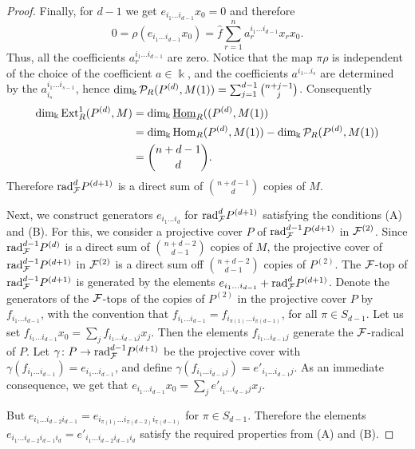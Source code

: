 \documentclass[10pt]{amsart}
\begin{document}
\begin{proof}
\noindent Finally, for $d-1$ we get $e_{i_1\ldots i_{d-1}}x_0 =0$ and therefore $$0=\rho (e_{i_1\ldots i_{d-1}}x_0)=\hat f\sum_{r=1}^na^{i_1\ldots i_{d-1}}_rx_r x_0.$$ 
\noindent Thus, all the coefficients
$a^{i_1\ldots i_{d-1}}_r$ are zero. Notice that the map $\pi\rho$ is independent  of the choice of 
the coefficient $a\in\Bbbk$, and the coefficients  $a^{i_1\ldots i_s}$ are determined by the $a^{i_1\ldots i_{s-1}}_{i_s}$,
hence $\operatorname{dim}\nolimits_{\Bbbk}\mathcal P_R(P^{(d)},M(1))=\sum_{j=1}^{d-1}\binom{n+j-1}{j}$. Consequently
\begin{align*}
\operatorname{dim}\nolimits_{\Bbbk}\operatorname{Ext}\nolimits_R^1(P^{(d)},M)\notag&=\operatorname{dim}\nolimits_{\Bbbk}\underline{\operatorname{Hom}}_R((P^{(d)},M(1))\notag\\&
=\operatorname{dim}\nolimits_{\Bbbk}\operatorname{Hom}_R(P^{(d)},M(1))-\operatorname{dim}\nolimits_{\Bbbk}\mathcal P_R(P^{(d)},M(1))\notag\\&=\binom{n+d-1}{d}.
\end{align*}
Therefore $\mbox{rad}_{\mathcal F}^{d}P^{(d+1)}$  is a direct sum
of $\binom{n+d-1}{d}$ copies of $M$.
\medskip

\noindent  Next, we construct generators $e_{i_1\ldots i_d}$ for $\mbox{rad}_{\mathcal F}^{d}P^{(d+1)}$ 
satisfying the conditions (A) and (B). For this, we consider a projective cover $P$ of $\mbox{rad}_{\mathcal F}^{d-1}P^{(d+1)}$ 
in $\mathcal F^{(2)}$.
 Since  $\mbox{rad}_{\mathcal F}^{d-1}P^{(d)}$ is a direct sum of  $\binom{n+d-2}{d-1}$ copies of $M$,  the
projective cover of  $\mbox{rad}_{\mathcal F}^{d-1}P^{(d+1)}$ in $\mathcal F^{(2)}$ is a direct sum off $\binom{n+d-2}{d-1}$ copies
of $P^{(2)}$. The $\mathcal F$-top of $\mbox{rad}_{\mathcal F}^{d-1}P^{(d+1)}$ is generated by the elements
$ e_{i_1\ldots i_{d-1}} +\mbox{rad}_{\mathcal F}^{d}P^{(d+1)}$. Denote the generators of the 
 $\mathcal F$-tops of the copies of $P^{(2)}$ in the projective cover $P$ by $f_{i_1\ldots i_{d-1}}$, 
 with the convention that $f_{i_1\ldots i_{d-1}}=f_{i_{\pi (1)}\ldots i_{\pi (d-1)}}$, for all $\pi\in S_{d-1}$.
 Let us set $f_{i_1\ldots i_{d-1}}x_0=\sum_jf_{i_1\ldots i_{d-1}j}x_j$. Then the elements $f_{i_1\ldots i_{d-1}j }$
generate the $\mathcal F$-radical of $P$.
\noindent Let 
$\gamma\colon P\to\mbox{rad}_{\mathcal F}^{d-1}P^{(d+1)}$ be the projective cover
with $\gamma(f_{i_1\ldots i_{d-1}})=e_{i_1\ldots i_{d-1}}$, and define 
$\gamma(f_{i_1\ldots i_{d-1}j})=e'_{i_1\ldots i_{d-1}j}$.  As an immediate consequence, we get that 
$e_{i_1\ldots i_{d-1}}x_0 = \sum_je'_{i_1\ldots i_{d-1}j}x_j$. 

\smallskip
{} But $e_{i_1\ldots i_{d-2}i_{d-1}} =
e_{i_{\pi(1)}\ldots i_{\pi(d-2)}i_{\pi(d-1)}}$ for $\pi\in S_{d-1}$. Therefore the elements
$e_{i_1\ldots i_{d-2}i_{d-1}i_d} = e'_{i_1\ldots i_{d-2}i_{d-1}i_d}$ satisfy the required properties from (A) and (B).
\medskip


\end{proof}
\end{document}
